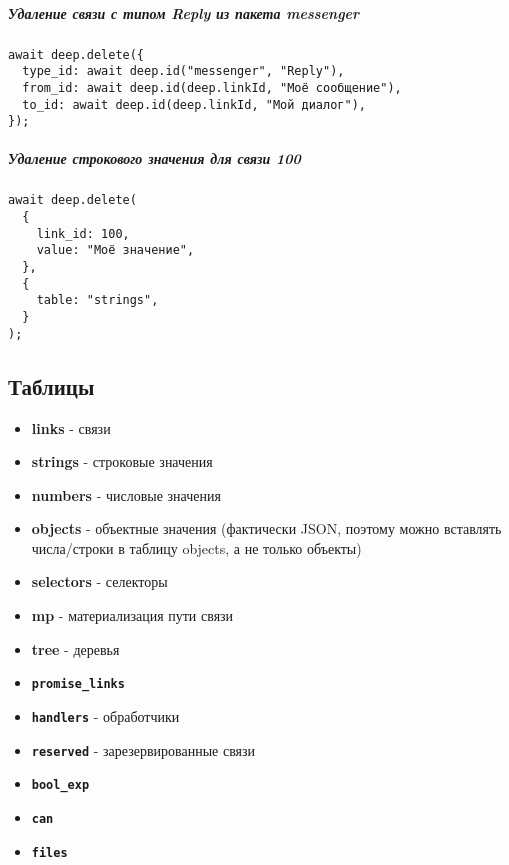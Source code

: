 \documentclass{article}
\begin{document}
\subparagraph{Удаление связи с типом Reply из пакета messenger}
\begin{verbatim}
await deep.delete({
  type_id: await deep.id("messenger", "Reply"),
  from_id: await deep.id(deep.linkId, "Моё сообщение"),
  to_id: await deep.id(deep.linkId, "Мой диалог"),
});
\end{verbatim}

\subparagraph{Удаление строкового значения для связи 100}
\begin{verbatim}
await deep.delete(
  {
    link_id: 100,
    value: "Моё значение",
  },
  {
    table: "strings",
  }
);
\end{verbatim}



\subsection{Таблицы}

\begin{itemize}
  \item \textbf{links} - связи
  \item \textbf{strings} - строковые значения
  \item \textbf{numbers} - числовые значения
  \item \textbf{objects} - объектные значения (фактически JSON, поэтому можно вставлять числа/строки в таблицу objects, а не только объекты)
  \item \textbf{selectors} - селекторы
  \item \textbf{mp} - материализация пути связи
  \item \textbf{tree} - деревья
  \item \textbf{\texttt{promise\_links}}
  \item \textbf{\texttt{handlers}} - обработчики
  \item \textbf{\texttt{reserved}} - зарезервированные связи
  \item \textbf{\texttt{bool\_exp}}
  \item \textbf{\texttt{can}}
  \item \textbf{\texttt{files}}
\end{itemize}
\end{document}
